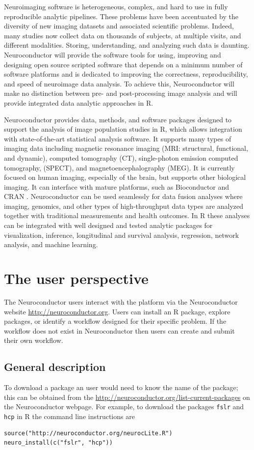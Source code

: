 \documentclass[]{elsarticle} %
\begin{document}
Neuroimaging software is heterogeneous, complex, and hard to use in fully reproducible analytic pipelines. These problems have been accentuated by the diversity of new imaging datasets and associated scientific problems. Indeed, many studies now collect data on thousands of subjects, at multiple visits, and different modalities. Storing, understanding, and analyzing such data is  daunting.  Neuroconductor will provide the software tools for using, improving and designing open source scripted software that depends on a minimum number of software platforms and is dedicated to improving the correctness, reproducibility, and speed of neuroimage data analysis. To achieve this, Neuroconductor will make no distinction between pre- and post-processing image analysis and will provide integrated data analytic approaches in R.


Neuroconductor provides data, methods, and software packages designed to support the analysis of image population studies in R, which allows integration with state-of-the-art statistical analysis software. It supports many types of imaging data including magnetic resonance imaging (MRI: structural, functional, and dynamic), computed tomography (CT), single-photon emission computed tomography, (SPECT), and magnetoencephalography (MEG). It is currently focused on human imaging, especially of the brain, but supports other biological imaging.  It can interface with mature platforms, such as Bioconductor \cite{bioc1,bioc2} and CRAN \cite{Hornik2016,r}. Neuroconductor can be used seamlessly for data fusion analyses where imaging, genomics, and other types of high-throughput data types are analyzed together with traditional measurements and health outcomes. In R these analyses can be integrated with well designed and tested analytic packages for visualization, inference, longitudinal and survival analysis, regression, network analysis, and machine learning.


\section{The user perspective}\label{section:user_perspective}
The Neuroconductor users interact with the platform via the Neuroconductor website \url{http://neuroconductor.org}. Users can install an R package, explore packages, or identify a workflow designed for their specific problem. If the workflow does not exist in Neuroconductor then users can create and submit their own workflow. 


\subsection{General description}\label{subsec:general_description}
To download a package an user would need to know the name of the package; this can be obtained from the \href{list of packages}{http://neuroconductor.org/list-current-packages} on the Neuroconductor webpage. For example, to download the packages \verb"fslr" and \verb"hcp" in R the command line instructions are 
\color{blue}
\begin{verbatim}
source("http://neuroconductor.org/neurocLite.R") 
neuro_install(c("fslr", "hcp"))
\end{verbatim}
\color{black}
\end{document}
